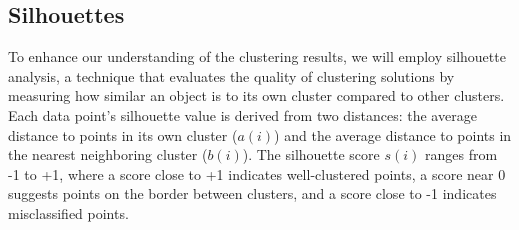 \documentclass{article}
\begin{document}
\subsection{Silhouettes}
To enhance our understanding of the clustering results, we will employ silhouette analysis, a technique that evaluates the quality of clustering solutions by measuring how similar an object is to its own cluster compared to other clusters. Each data point's silhouette value is derived from two distances: the average distance to points in its own cluster (\(a(i)\)) and the average distance to points in the nearest neighboring cluster (\(b(i)\)). The silhouette score \(s(i)\) ranges from -1 to +1, where a score close to +1 indicates well-clustered points, a score near 0 suggests points on the border between clusters, and a score close to -1 indicates misclassified points. 
\\
\end{document}
